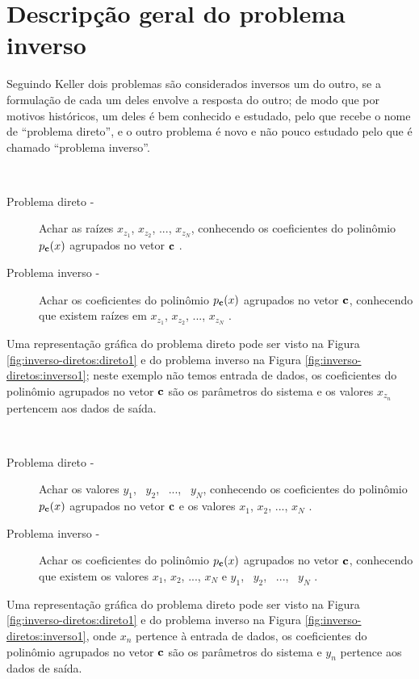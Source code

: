 
\section{Descripção geral do problema inverso}

Seguindo Keller \cite{Keller76} dois problemas são considerados inversos 
um do outro, se a formulação de cada um deles envolve a resposta do outro;
de modo que por motivos históricos, um deles é bem conhecido e estudado,
pelo que recebe o nome de ``problema direto'', 
e o outro problema é novo e não pouco estudado pelo que é chamado ``problema inverso''.
 
\begin{example}~
\begin{description}
\item[Problema direto -] Achar as raízes $x_{z_1}$, $x_{z_2}$, ..., $x_{z_N}$, 
conhecendo os coeficientes do polinômio $p_{\VECTOR{c}}(x)$ agrupados no vetor $\VECTOR{c}$  \cite{Keller76}.
\item[Problema inverso -] Achar os coeficientes do polinômio $p_{\VECTOR{c}}(x)$ agrupados no vetor $\VECTOR{c}$, 
conhecendo que existem raízes em $x_{z_1}$, $x_{z_2}$, ..., $x_{z_N}$ \cite{Keller76}.
\end{description}
Uma representação gráfica do problema direto pode ser visto na Figura \ref{fig:inverso-diretos:direto1}
e do problema inverso na Figura \ref{fig:inverso-diretos:inverso1};
neste exemplo não temos entrada de dados, 
os coeficientes do polinômio agrupados no vetor $\VECTOR{c}$ são os parâmetros do sistema e 
os valores $x_{z_n}$ pertencem aos dados de saída.
\end{example}

\begin{example}~
\begin{description}
\item[Problema direto -] Achar os valores $y_1$,~ $y_2$,~ ...,~ $y_N$, 
conhecendo os coeficientes do polinômio $p_{\VECTOR{c}}(x)$ agrupados no vetor $\VECTOR{c}$ e
os valores $x_1$, $x_2$, ..., $x_N$ \cite{Keller76}.
\item[Problema inverso -] Achar os coeficientes do polinômio $p_{\VECTOR{c}}(x)$ agrupados no vetor $\VECTOR{c}$, 
conhecendo que existem os valores $x_1$, $x_2$, ..., $x_N$ e 
$y_1$,~ $y_2$,~ ...,~ $y_N$  \cite{Keller76}.
\end{description}
Uma representação gráfica do problema direto pode ser visto na Figura \ref{fig:inverso-diretos:direto1}
e do problema inverso na Figura \ref{fig:inverso-diretos:inverso1}, 
onde $x_n$ pertence à entrada de dados, 
os coeficientes do polinômio agrupados no vetor $\VECTOR{c}$ são os parâmetros do sistema e $y_n$ pertence aos dados de saída.
\end{example}


